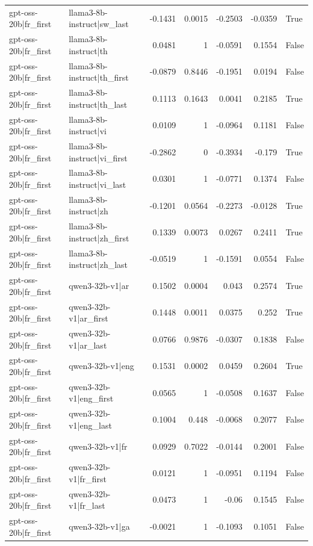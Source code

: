 \begin{table}
\begin{tabular}{l l r r r r l}
gpt-oss-20b|fr_first & llama3-8b-instruct|sw_last & -0.1431 & 0.0015 & -0.2503 & -0.0359 & True \\
gpt-oss-20b|fr_first & llama3-8b-instruct|th & 0.0481 & 1 & -0.0591 & 0.1554 & False \\
gpt-oss-20b|fr_first & llama3-8b-instruct|th_first & -0.0879 & 0.8446 & -0.1951 & 0.0194 & False \\
gpt-oss-20b|fr_first & llama3-8b-instruct|th_last & 0.1113 & 0.1643 & 0.0041 & 0.2185 & True \\
gpt-oss-20b|fr_first & llama3-8b-instruct|vi & 0.0109 & 1 & -0.0964 & 0.1181 & False \\
gpt-oss-20b|fr_first & llama3-8b-instruct|vi_first & -0.2862 & 0 & -0.3934 & -0.179 & True \\
gpt-oss-20b|fr_first & llama3-8b-instruct|vi_last & 0.0301 & 1 & -0.0771 & 0.1374 & False \\
gpt-oss-20b|fr_first & llama3-8b-instruct|zh & -0.1201 & 0.0564 & -0.2273 & -0.0128 & True \\
gpt-oss-20b|fr_first & llama3-8b-instruct|zh_first & 0.1339 & 0.0073 & 0.0267 & 0.2411 & True \\
gpt-oss-20b|fr_first & llama3-8b-instruct|zh_last & -0.0519 & 1 & -0.1591 & 0.0554 & False \\
gpt-oss-20b|fr_first & qwen3-32b-v1|ar & 0.1502 & 0.0004 & 0.043 & 0.2574 & True \\
gpt-oss-20b|fr_first & qwen3-32b-v1|ar_first & 0.1448 & 0.0011 & 0.0375 & 0.252 & True \\
gpt-oss-20b|fr_first & qwen3-32b-v1|ar_last & 0.0766 & 0.9876 & -0.0307 & 0.1838 & False \\
gpt-oss-20b|fr_first & qwen3-32b-v1|eng & 0.1531 & 0.0002 & 0.0459 & 0.2604 & True \\
gpt-oss-20b|fr_first & qwen3-32b-v1|eng_first & 0.0565 & 1 & -0.0508 & 0.1637 & False \\
gpt-oss-20b|fr_first & qwen3-32b-v1|eng_last & 0.1004 & 0.448 & -0.0068 & 0.2077 & False \\
gpt-oss-20b|fr_first & qwen3-32b-v1|fr & 0.0929 & 0.7022 & -0.0144 & 0.2001 & False \\
gpt-oss-20b|fr_first & qwen3-32b-v1|fr_first & 0.0121 & 1 & -0.0951 & 0.1194 & False \\
gpt-oss-20b|fr_first & qwen3-32b-v1|fr_last & 0.0473 & 1 & -0.06 & 0.1545 & False \\
gpt-oss-20b|fr_first & qwen3-32b-v1|ga & -0.0021 & 1 & -0.1093 & 0.1051 & False \\

\end{tabular}
\end{table}
